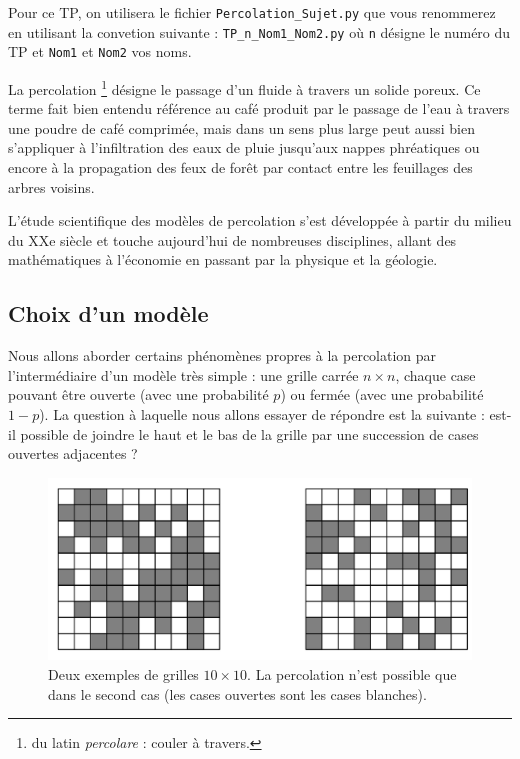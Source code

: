 \documentclass[t,10pt]{article}
\begin{document}
\enteteinfo

\graphicspath{{images}}

\setcounter{numques}{0}

Pour ce TP, on utilisera le fichier \texttt{Percolation\_Sujet.py} que vous renommerez en utilisant la convetion suivante : 
\texttt{TP\_n\_Nom1\_Nom2.py} où \texttt{n} désigne le numéro du TP et \texttt{Nom1} et \texttt{Nom2} vos noms.

La percolation \footnote{du latin \emph{percolare} : couler à travers.} désigne le passage d'un fluide à
travers un solide poreux. Ce terme fait bien entendu référence au café
produit par le passage de l'eau à travers une poudre de café comprimée,
mais dans un sens plus large peut aussi bien s'appliquer à
l'infiltration des eaux de pluie jusqu'aux nappes phréatiques ou encore
à la propagation des feux de forêt par contact entre les feuillages des
arbres voisins.

L'étude scientifique des modèles de percolation s'est développée à
partir du milieu du XXe siècle et touche aujourd'hui de nombreuses
disciplines, allant des mathématiques à l'économie en passant par la
physique et la géologie.

\subsection*{Choix d'un modèle}\label{choix-dun-modele}


Nous allons aborder certains phénomènes propres à la percolation par
l'intermédiaire d'un modèle très simple : une grille carrée $n\times n$,
chaque case pouvant être ouverte (avec une probabilité $p$) ou
fermée (avec une probabilité $1-p$). La question à laquelle nous
allons essayer de répondre est la suivante : est-il possible de joindre
le haut et le bas de la grille par une succession de cases ouvertes
adjacentes ?

\begin{figure}[H]
\begin{center}
\includegraphics[width=\linewidth]{illustration_perco.jpg}
\caption{Deux exemples de grilles $10\times10$. La percolation
n'est possible que dans le second cas (les cases ouvertes sont les cases
blanches). \label{fig1}}
\end{center}
\end{figure}
\end{document}
